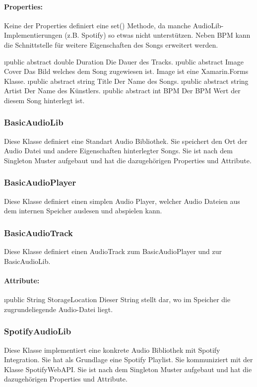 \documentclass[../entwurf.tex]{subfiles}
\begin{document}
				\paragraph{Properties:}
					Keine der Properties definiert eine set() Methode, da manche AudioLib-Implementierungen (z.B. Spotify) so etwas nicht
					unterstützen. Neben BPM kann die Schnittstelle für weitere Eigenschaften des Songs erweitert werden.
					\begin{itemize}
						\i{public abstract double Duration} Die Dauer des Tracks.
						\i{public abstract Image Cover} Das Bild welches dem Song zugewiesen ist. Image ist eine Xamarin.Forms Klasse.
						\i{public abstract string Title} Der Name des Songs.
						\i{public abstract string Artist} Der Name des Künstlers.
						\i{public abstract int BPM} Der BPM Wert der diesem Song hinterlegt ist.
					\end{itemize}
			\subsubsection{BasicAudioLib}
				Diese Klasse definiert eine Standart Audio Bibliothek. Sie speichert den Ort der Audio Datei und andere Eigenschaften hinterlegter
				Songs. Sie ist nach dem Singleton Muster aufgebaut und hat die dazugehörigen Properties und Attribute.
			\subsubsection{BasicAudioPlayer}
				Diese Klasse definiert einen simplen Audio Player, welcher Audio Dateien aus dem internen Speicher auslesen und abspielen kann.
			\subsubsection{BasicAudioTrack}
				Diese Klasse definiert einen AudioTrack zum BasicAudioPlayer und zur BasicAudioLib.
				\paragraph{Attribute:}
					\begin{itemize}
						\i{public String StorageLocation} Dieser String stellt dar, wo im Speicher die zugrundeliegende Audio-Datei liegt.
					\end{itemize}
			\subsubsection{SpotifyAudioLib}
				Diese Klasse implementiert eine konkrete Audio Bibliothek mit Spotify Integration.
				Sie hat als Grundlage eine Spotify Playlist. Sie kommuniziert mit der Klasse SpotifyWebAPI.
				Sie ist nach dem Singleton Muster aufgebaut und hat die dazugehörigen Properties und Attribute.
\end{document}
